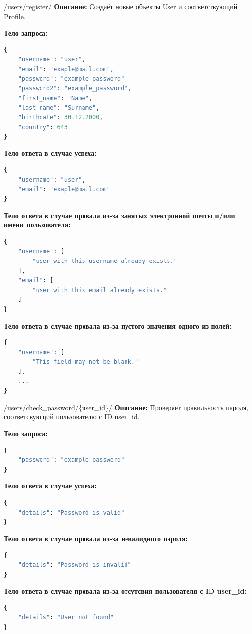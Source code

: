 \documentclass[a4paper,14pt]{extarticle}
\begin{document}
	\begin{postapi}{/users/register/}
		\textbf{Описание:} Создаёт новые объекты User и соответствующий Profile.\medskip
		
		\textbf{Тело запроса:}
		\begin{lstlisting}[language=Python]
{
    "username": "user",
    "email": "exaple@mail.com",
    "password": "example_password",
    "password2": "example_password",
    "first_name": "Name",
    "last_name": "Surname",
    "birthdate": 30.12.2000,
    "country": 643
}
		\end{lstlisting}
		
		\textbf{Тело ответа в случае успеха:}
		\begin{lstlisting}[language=Python]
{
    "username": "user",
    "email": "exaple@mail.com"
}
		\end{lstlisting}
		
		\textbf{Тело ответа в случае провала из-за занятых электронной почты и/или имени пользователя:}
		\begin{lstlisting}[language=Python]
{
    "username": [
        "user with this username already exists."
    ],
    "email": [
        "user with this email already exists."
    ]
}
		\end{lstlisting}
		
		\textbf{Тело ответа в случае провала из-за пустого значения одного из полей:}
		\begin{lstlisting}[language=Python]
{
    "username": [
        "This field may not be blank."
    ],
    ...
}
		\end{lstlisting}
	\end{postapi}
	
	\begin{postapi}{/users/check\_password/\{user\_id\}/}
		\textbf{Описание:} Проверяет правильность пароля, соответсвующий пользователю с ID user\_id.\medskip
		
		\textbf{Тело запроса:}
		\begin{lstlisting}[language=Python]
{
    "password": "example_password"
}
		\end{lstlisting}
		
		\textbf{Тело ответа в случае успеха:}
		\begin{lstlisting}[language=Python]
{
    "details": "Password is valid"
}
		\end{lstlisting}
		
		\textbf{Тело ответа в случае провала из-за невалидного пароля:}
		\begin{lstlisting}[language=Python]
{
    "details": "Password is invalid"
}
		\end{lstlisting}
		
		\textbf{Тело ответа в случае провала из-за отсутсвия пользователя с ID user\_id:}
		\begin{lstlisting}[language=Python]
{
    "details": "User not found"
}
		\end{lstlisting}
	\end{postapi}
	
\end{document}
